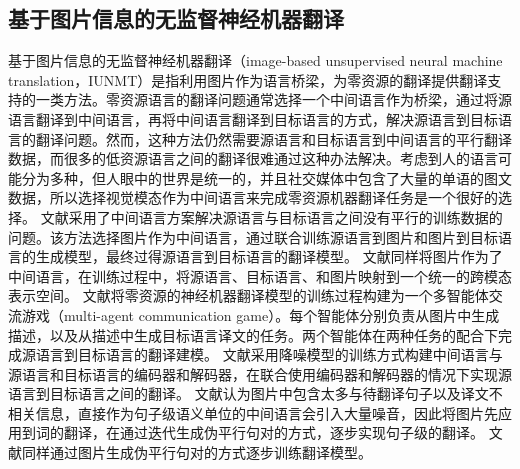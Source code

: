 
\subsection{基于图片信息的无监督神经机器翻译}

基于图片信息的无监督神经机器翻译（image-based unsupervised neural machine translation，IUNMT）是指利用图片作为语言桥梁，为零资源的翻译提供翻译支持的一类方法。零资源语言的翻译问题通常选择一个中间语言作为桥梁，通过将源语言翻译到中间语言，再将中间语言翻译到目标语言的方式，解决源语言到目标语言的翻译问题。然而，这种方法仍然需要源语言和目标语言到中间语言的平行翻译数据，而很多的低资源语言之间的翻译很难通过这种办法解决。考虑到人的语言可能分为多种，但人眼中的世界是统一的，并且社交媒体中包含了大量的单语的图文数据，所以选择视觉模态作为中间语言来完成零资源机器翻译任务是一个很好的选择。
文献\cite{115_saha-etal-2016-correlational}采用了中间语言方案解决源语言与目标语言之间没有平行的训练数据的问题。该方法选择图片作为中间语言，通过联合训练源语言到图片和图片到目标语言的生成模型，最终过得源语言到目标语言的翻译模型。
文献\cite{54_DBLP:journals/mt/NakayamaN17}同样将图片作为了中间语言，在训练过程中，将源语言、目标语言、和图片映射到一个统一的跨模态表示空间。
文献\cite{125_DBLP:conf/aaai/ChenLL18}将零资源的神经机器翻译模型的训练过程构建为一个多智能体交流游戏（multi-agent communication game）。每个智能体分别负责从图片中生成描述，以及从描述中生成目标语言译文的任务。两个智能体在两种任务的配合下完成源语言到目标语言的翻译建模。
文献\cite{126_DBLP:conf/cvpr/SuFBKH19}采用降噪模型的训练方式构建中间语言与源语言和目标语言的编码器和解码器，在联合使用编码器和解码器的情况下实现源语言到目标语言之间的翻译。
文献\cite{55_DBLP:conf/ijcai/ChenJF19}认为图片中包含太多与待翻译句子以及译文不相关信息，直接作为句子级语义单位的中间语言会引入大量噪音，因此将图片先应用到词的翻译，在通过迭代生成伪平行句对的方式，逐步实现句子级的翻译。
文献\cite{127_huang-etal-2020-unsupervised-multimodal}同样通过图片生成伪平行句对的方式逐步训练翻译模型。

